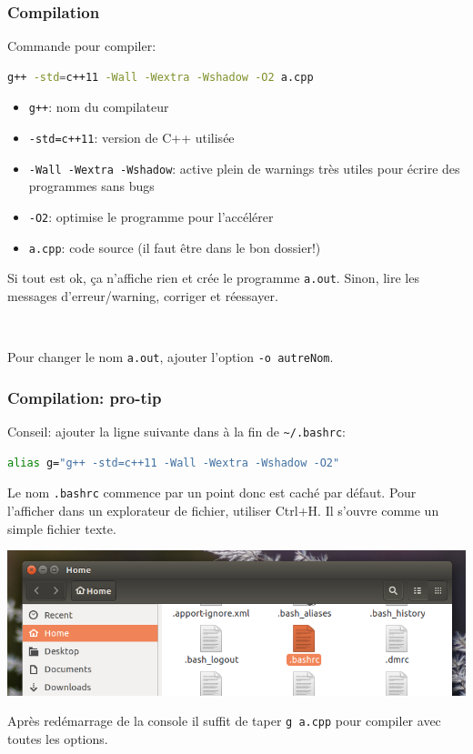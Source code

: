\documentclass[12pt]{beamer}
\begin{document}
\begin{frame}[fragile]
\frametitle{Compilation}
Commande pour compiler:
\begin{lstlisting}[language=bash]
g++ -std=c++11 -Wall -Wextra -Wshadow -O2 a.cpp
\end{lstlisting}
\begin{itemize}
\item \lstinline|g++|: nom du compilateur
\item \lstinline|-std=c++11|: version de C++ utilisée
\item \lstinline|-Wall -Wextra -Wshadow|: active plein de warnings très utiles pour écrire des programmes sans bugs
\item \lstinline|-O2|: optimise le programme pour l'accélérer
\item \lstinline|a.cpp|: code source (il faut être dans le bon dossier!)
\end{itemize}
Si tout est ok, ça n'affiche rien et crée le programme \lstinline|a.out|. Sinon, lire les messages d'erreur/warning, corriger et réessayer.

~

Pour changer le nom \lstinline|a.out|, ajouter l'option \lstinline|-o autreNom|.
\end{frame}

\begin{frame}[fragile]
\frametitle{Compilation: pro-tip}
Conseil: ajouter la ligne suivante dans à la fin de \lstinline|~/.bashrc|:
\begin{lstlisting}[language=bash]
alias g="g++ -std=c++11 -Wall -Wextra -Wshadow -O2"
\end{lstlisting}
Le nom \lstinline|.bashrc| commence par un point donc est caché par défaut. Pour l'afficher dans un explorateur de fichier, utiliser Ctrl+H. Il s'ouvre comme un simple fichier texte.
\begin{center}
\includegraphics[height=0.2\textwidth]{img/bashrc}
\end{center}

Après redémarrage de la console il suffit de taper \lstinline|g a.cpp| pour compiler avec toutes les options.
\end{frame}
\end{document}

